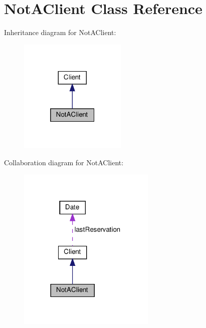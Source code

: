 \hypertarget{class_not_a_client}{}\section{Not\+A\+Client Class Reference}
\label{class_not_a_client}


Inheritance diagram for Not\+A\+Client\+:\nopagebreak
\begin{figure}[H]
\begin{center}
\leavevmode
\includegraphics[width=145pt]{class_not_a_client__inherit__graph}
\end{center}
\end{figure}


Collaboration diagram for Not\+A\+Client\+:
\nopagebreak
\begin{figure}[H]
\begin{center}
\leavevmode
\includegraphics[width=185pt]{class_not_a_client__coll__graph}
\end{center}
\end{figure}
